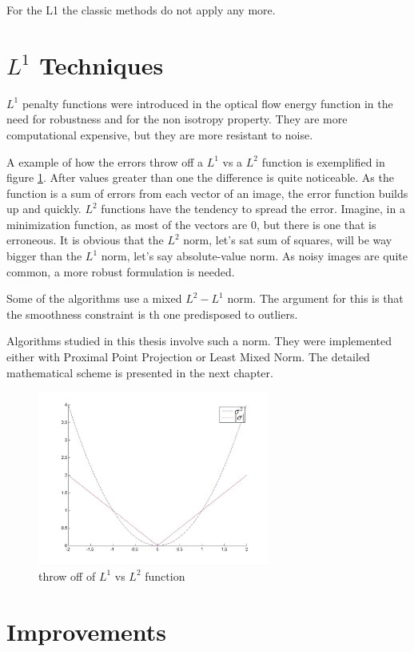 \documentclass[12pt,a4paper,twoside]{report}
\begin{document}
For the L1 the classic methods do not apply  any more.


\section{$L^1$ Techniques}

$L^1$ penalty functions were introduced in the optical flow energy function in the need for robustness and for the non isotropy property. They are more computational expensive, but they are more resistant to noise.

 A example of how the errors throw off a $L^1$ vs a $L^2$ function is exemplified in figure \ref{func}. After values greater than one the difference is quite noticeable. As the function is a sum of errors from each vector of an image, the error function builds up and quickly. $L^2$ functions have the tendency to spread the error. Imagine, in a minimization function, as most of the vectors are $0$, but there is one that is erroneous. It is obvious that the $L^2$ norm, let's sat sum of squares, will be way bigger than the $L^1$ norm, let's say absolute-value norm. As noisy images are quite common, a more robust formulation is needed.
 
Some of the algorithms use a mixed  $L^2-L^1$ norm. The argument for this is that the smoothness constraint is th one predisposed to outliers. 
 
Algorithms studied in this thesis involve such a norm. They were implemented either with Proximal Point Projection or Least Mixed Norm. The detailed mathematical scheme is presented in the next chapter.
\begin{figure} \label{func}
	\centering
	\includegraphics[width = 3in]{img/func} 
	\caption{  throw off of $L^1$ vs $L^2$ function }
\end{figure}


\section{Improvements}
\end{document}
